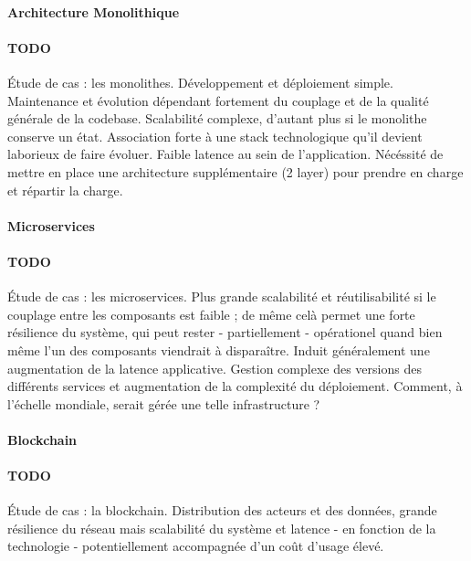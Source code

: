\paragraph{Architecture Monolithique}

\cite{Microservices3} \cite{Microservices4} \cite{Microservices5} \cite{Microservices6}

\paragraph{TODO} Étude de cas : les monolithes. Développement et déploiement simple. Maintenance et évolution dépendant fortement
du couplage et de la qualité générale de la codebase. Scalabilité complexe, d'autant plus si le monolithe conserve un 
état. Association forte à une stack technologique qu'il devient laborieux de faire évoluer. Faible latence au sein de 
l'application. Nécéssité de mettre en place une architecture supplémentaire (2 layer) pour prendre en charge et
répartir la charge.


\paragraph{Microservices}

\cite{Microservices0} \cite{Microservices1} \cite{Microservices2}

\paragraph{TODO} Étude de cas : les microservices. Plus grande scalabilité et réutilisabilité si le couplage entre les composants
est faible ; de même celà permet une forte résilience du système, qui peut rester - partiellement - opérationel quand
bien même l'un des composants viendrait à disparaître. Induit généralement une augmentation de la latence applicative.
Gestion complexe des versions des différents services et augmentation de la complexité du déploiement. Comment, à l'échelle
mondiale, serait gérée une telle infrastructure ?


\paragraph{Blockchain}

\cite{Blockchain0} \cite{Blockchain1}

\paragraph{TODO} Étude de cas : la blockchain. Distribution des acteurs et des données, grande résilience du réseau mais scalabilité
du système et latence - en fonction de la technologie - potentiellement accompagnée d'un coût d'usage élevé.

